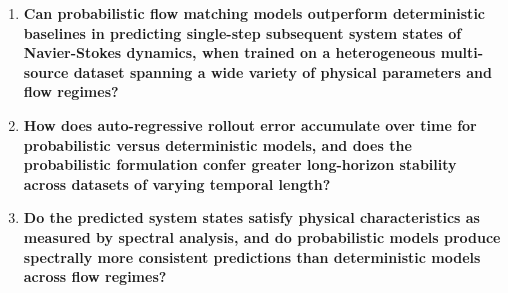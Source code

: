 \begin{enumerate}
	\item \textbf{Can probabilistic flow matching models outperform deterministic baselines in predicting single-step subsequent system states of Navier-Stokes dynamics, when trained on a heterogeneous multi-source dataset spanning a wide variety of physical parameters and flow regimes?}
	\item \textbf{How does auto-regressive rollout error accumulate over time for probabilistic versus deterministic models, and does the probabilistic formulation confer greater long-horizon stability across datasets of varying temporal length?}
	\item \textbf{Do the predicted system states satisfy physical characteristics as measured by spectral analysis, and do probabilistic models produce spectrally more consistent predictions than deterministic models across flow regimes?}
\end{enumerate}